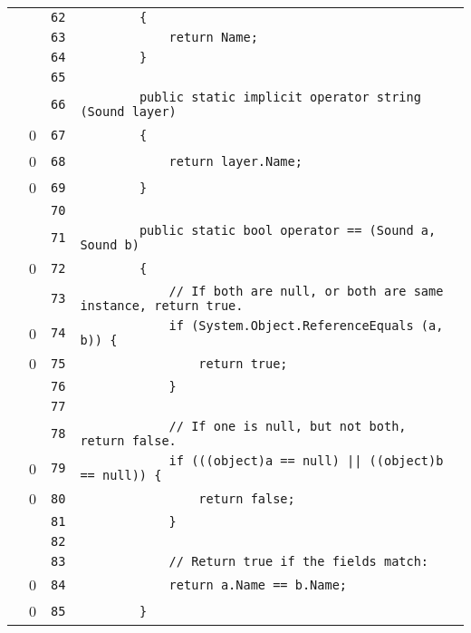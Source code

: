 \documentclass[a4paper,10pt]{article}
\begin{document}
\begin{longtable}[l]{lrrl}
\cellcolor{gray} &  & \verb~62~ & \verb~        {~\\
\cellcolor{gray} &  & \verb~63~ & \verb~            return Name;~\\
\cellcolor{gray} &  & \verb~64~ & \verb~        }~\\
\cellcolor{gray} &  & \verb~65~ & \verb~~\\
\cellcolor{gray} &  & \verb~66~ & \verb~        public static implicit operator string (Sound layer)~\\
\cellcolor{red} & 0 & \verb~67~ & \verb~        {~\\
\cellcolor{red} & 0 & \verb~68~ & \verb~            return layer.Name;~\\
\cellcolor{red} & 0 & \verb~69~ & \verb~        }~\\
\cellcolor{gray} &  & \verb~70~ & \verb~~\\
\cellcolor{gray} &  & \verb~71~ & \verb~        public static bool operator == (Sound a, Sound b)~\\
\cellcolor{red} & 0 & \verb~72~ & \verb~        {~\\
\cellcolor{gray} &  & \verb~73~ & \verb~            // If both are null, or both are same instance, return true.~\\
\cellcolor{red} & 0 & \verb~74~ & \verb~            if (System.Object.ReferenceEquals (a, b)) {~\\
\cellcolor{red} & 0 & \verb~75~ & \verb~                return true;~\\
\cellcolor{gray} &  & \verb~76~ & \verb~            }~\\
\cellcolor{gray} &  & \verb~77~ & \verb~~\\
\cellcolor{gray} &  & \verb~78~ & \verb~            // If one is null, but not both, return false.~\\
\cellcolor{red} & 0 & \verb~79~ & \verb~            if (((object)a == null) || ((object)b == null)) {~\\
\cellcolor{red} & 0 & \verb~80~ & \verb~                return false;~\\
\cellcolor{gray} &  & \verb~81~ & \verb~            }~\\
\cellcolor{gray} &  & \verb~82~ & \verb~~\\
\cellcolor{gray} &  & \verb~83~ & \verb~            // Return true if the fields match:~\\
\cellcolor{red} & 0 & \verb~84~ & \verb~            return a.Name == b.Name;~\\
\cellcolor{red} & 0 & \verb~85~ & \verb~        }~\\

\end{longtable}
\end{document}
